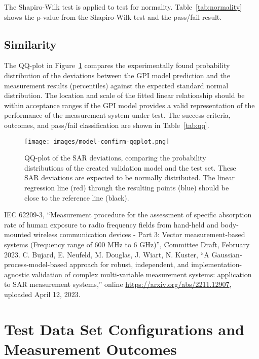 \documentclass{article}
\begin{document}
The Shapiro-Wilk test is applied to test for normality. Table~\ref{tab:normality} shows the p-value from the Shapiro-Wilk test and the pass/fail result.



\FloatBarrier
\subsection{Similarity}

The QQ-plot in Figure~\ref{fig:confirm-qqplot} compares the experimentally found probability distribution of the deviations between the GPI model prediction and the measurement results (percentiles) against the expected standard normal distribution. The location and scale of the fitted linear relationship should be within acceptance ranges if the GPI model provides a valid representation of the performance of the measurement system under test. The success criteria, outcomes, and pass/fail classification are shown in Table~\ref{tab:qq}.



\begin{figure} \centering
\texttt{[image: images/model-confirm-qqplot.png]}
\caption{QQ-plot of the SAR deviations, comparing the probability distributions of the created validation model and the test set. These SAR deviations are expected to be normally distributed. The linear regression line (red) through the resulting points (blue) should be close to the reference line (black).} \label{fig:confirm-qqplot}
\end{figure}

\FloatBarrier
\begin{thebibliography}{9}
IEC 62209-3, ``Measurement procedure for the assessment of specific absorption rate of human exposure to radio frequency fields from hand-held and body-mounted wireless communication devices - Part 3: Vector measurement-based systems (Frequency range of 600 MHz to 6 GHz)'', Committee Draft, February 2023.
C. Bujard, E. Neufeld, M. Douglas, J. Wiart, N. Kuster, ``A Gaussian-process-model-based approach for robust, independent, and implementation-agnostic validation of complex multi-variable measurement systems: application to SAR measurement systems,'' online \url{https://arxiv.org/abs/2211.12907}, uploaded April 12, 2023.
\end{thebibliography}

\FloatBarrier
\newpage
\appendix
\section{Test Data Set Configurations and Measurement Outcomes} \label{sec:test-data}


\end{document}
